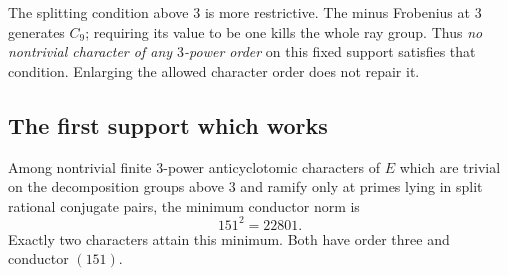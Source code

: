 The splitting condition above $3$ is more restrictive. The minus Frobenius at $3$ generates $C_9$; requiring its value to be one kills the whole ray group. Thus \emph{no nontrivial character of any $3$-power order} on this fixed support satisfies that condition. Enlarging the allowed character order does not repair it.

\subsection{The first support which works}

\begin{theorem}\label{thm:minimum}
Among nontrivial finite $3$-power anticyclotomic characters of $E$ which are trivial on the decomposition groups above $3$ and ramify only at primes lying in split rational conjugate pairs, the minimum conductor norm is
\[
                              151^2=22801.
\]
Exactly two characters attain this minimum. Both have order three and conductor $(151)$.
\end{theorem}

